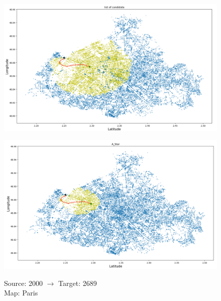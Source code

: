 \documentclass[a4paper,11pt]{report}
\begin{document}
\begin{figure}[H]
	\centering
	\begin{minipage}[b]{\textwidth}
		\includegraphics[width=\textwidth]{img/mapOutput/2000-2689LoC.png}
		\label{fig:ListOfCandidate2}
	\end{minipage}
	\hfill
	\begin{minipage}[b]{\textwidth}
		\includegraphics[width=\textwidth]{img/mapOutput/2000-2689A_Star.png}
		\label{fig:A_Start2}
	\end{minipage}
	Source: 2000 $\to$ Target: 2689\\Map: Paris
\end{figure}
\end{document}
